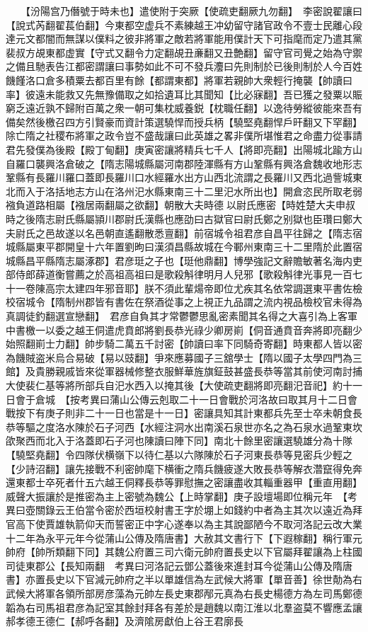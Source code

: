 　　【汾陽宫乃僭號于時未也】遣使附于突厥【使疏吏翻厥九勿翻】　李密說翟讓曰【說式芮翻翟萇伯翻】今東都空虚兵不素練越王冲幼留守諸官政令不壹士民離心段達元文都闇而無謀以僕料之彼非將軍之敵若將軍能用僕計天下可指麾而定乃遣其黨裴叔方覘東都虚實【守式又翻令力定翻覘丑亷翻又丑艶翻】留守官司覺之始為守禦之備且馳表告江都密謂讓曰事勢如此不可不發兵灋曰先則制於已後則制於人今百姓饑饉洛口倉多積粟去都百里有餘【都謂東都】將軍若親帥大衆輕行掩襲【帥讀曰率】彼遠未能救又先無豫備取之如拾遺耳比其聞知【比必寐翻】吾已獲之發粟以賑窮乏遠近孰不歸附百萬之衆一朝可集枕威養鋭【枕職任翻】以逸待勞縱彼能來吾有備矣然後檄召四方引賢豪而資計策選驍悍而授兵柄【驍堅堯翻悍戶旰翻又下罕翻】除亡隋之社稷布將軍之政令豈不盛哉讓曰此英雄之畧非僕所堪惟君之命盡力從事請君先發僕為後殿【殿丁甸翻】庚寅密讓將精兵七千人【將即亮翻】出陽城北踰方山自羅口襲興洛倉破之【隋志陽城縣屬河南郡陸渾縣有方山鞏縣有興洛倉魏收地形志鞏縣有長羅川羅口蓋即長羅川口水經羅水出方山西北流謂之長羅川又西北過訾城東北而入于洛括地志方山在洛州汜水縣東南三十二里汜水所出也】開倉恣民所取老弱襁負道路相屬【襁居兩翻屬之欲翻】朝散大夫時德以尉氏應密【時姓楚大夫申叔時之後隋志尉氏縣屬頴川郡尉氏漢縣也應劭曰古獄官曰尉氏鄭之别獄也臣瓚曰鄭大夫尉氏之邑故遂以名邑朝直遙翻散悉亶翻】前宿城令祖君彦自昌平往歸之【隋志宿城縣屬東平郡開皇十六年置劉昫曰漢須昌縣故城在今鄆州東南三十二里隋於此置宿城縣昌平縣隋志屬涿郡】君彦珽之子也【珽他鼎翻】博學強記文辭贍敏著名海内吏部侍郎薛道衡嘗薦之於高祖高祖曰是歌殺斛律明月人兒邪【歌殺斛律光事見一百七十一卷陳高宗太建四年邪音耶】朕不須此輩煬帝即位尤疾其名依常調選東平書佐檢校宿城令【隋制州郡皆有書佐在祭酒從事之上視正九品謂之流内視品檢校官未得為真調徒釣翻選宣戀翻】　君彦自負其才常鬱鬱思亂密素聞其名得之大喜引為上客軍中書檄一以委之越王侗遣虎賁郎將劉長恭光祿少卿房崱【侗音通賁音奔將即亮翻少始照翻崱士力翻】帥步騎二萬五千討密【帥讀曰率下同騎奇寄翻】時東都人皆以密為饑賊盗米烏合易破【易以豉翻】爭來應募國子三舘學士【隋以國子太學四門為三館】及貴勝親戚皆來從軍器械修整衣服鮮華旌旗鉦鼓甚盛長恭等當其前使河南討捕大使裴仁基等將所部兵自汜水西入以掩其後【大使疏吏翻將即亮翻汜音祀】約十一日會于倉城　【按考異曰蒲山公傳云剋取二十一日會戰於河洛故曰取其月十二日會戰按下有庚子則非二十一日也當是十一日】密讓具知其計東都兵先至士卒未朝食長恭等驅之度洛水陳於石子河西【水經注洞水出南溪石泉世亦名之為石泉水過鞏東坎欿聚西而北入于洛蓋即石子河也陳讀曰陣下同】南北十餘里密讓選驍雄分為十隊【驍堅堯翻】令四隊伏横嶺下以待仁基以六隊陳於石子河東長恭等見密兵少輕之【少詩沼翻】讓先接戰不利密帥麾下横衝之隋兵饑疲遂大敗長恭等解衣濳竄得免奔還東都士卒死者什五六越王侗釋長恭等罪慰撫之密讓盡收其輜重器甲【重直用翻】威聲大振讓於是推密為主上密號為魏公【上時掌翻】庚子設壇場即位稱元年　【考異曰壺關錄云王伯當令密於西垣校射書王字於堋上如錢約中者為主其次以遠近為拜官高下使賈雄執箭仰天而誓密正中字心遂奉以為主其說鄙陋今不取河洛記云改大業十二年為永平元年今從蒲山公傳及隋唐書】大赦其文書行下【下遐稼翻】稱行軍元帥府【帥所類翻下同】其魏公府置三司六衛元帥府置長史以下官屬拜翟讓為上柱國司徒東郡公【長知兩翻　考異曰河洛記云鄧公蓋後來進封耳今從蒲山公傳及隋唐書】亦置長史以下官減元帥府之半以單雄信為左武候大將軍【單音善】徐世勣為右武候大將軍各領所部房彦藻為元帥左長史東郡邴元真為右長史楊德方為左司馬鄭德韜為右司馬祖君彦為記室其餘封拜各有差於是趙魏以南江淮以北羣盗莫不響應孟讓郝孝德王德仁【郝呼各翻】及濟隂房獻伯上谷王君廓長